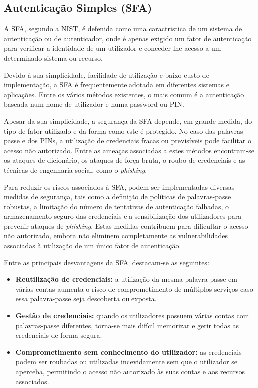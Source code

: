 \subsection{Autenticação Simples (SFA)}

\hspace{1cm} A SFA, segundo a NIST, é defenida como uma caractristica de um sistema de autenticação ou de autenticador, onde é apenas exigido um fator de autenticação  para verificar a identidade de um utilizador e conceder-lhe acesso a um determinado sistema ou recurso.

\hspace{1cm} Devido à sua simplicidade, facilidade de utilização e baixo custo de implementação, a SFA é frequentemente adotada em diferentes sistemas e aplicações. Entre os vários métodos existentes, o mais comum é a autenticação baseada num nome de utilizador e numa password ou PIN.

\hspace{1cm} Apesar da sua simplicidade, a segurança da SFA depende, em grande medida, do tipo de fator utilizado e da forma como este é protegido. No caso das palavras-passe e dos PINs, a utilização de credenciais fracas ou previsíveis pode facilitar o acesso não autorizado. Entre as ameaças associadas a estes métodos encontram-se os ataques de dicionário, os ataques de força bruta, o roubo de credenciais e as técnicas de engenharia social, como o \textit{phishing}. 

\hspace{1cm} Para reduzir os riscos associados à SFA, podem ser implementadas diversas medidas de segurança, tais como a definição de políticas de palavras-passe robustas, a limitação do número de tentativas de autenticação falhadas, o armazenamento seguro das credenciais e a sensibilização dos utilizadores para prevenir ataques de \textit{phishing}. Estas medidas contribuem para dificultar o acesso não autorizado, embora não eliminem completamente as vulnerabilidades associadas à utilização de um único fator de autenticação.

\hspace{1cm} Entre as principais desvantagens da SFA, destacam-se as seguintes:

\begin{itemize}[leftmargin=2cm]
    \item \textbf{Reutilização de credenciais:} a utilização da mesma palavra-passe em várias contas aumenta o risco de comprometimento de múltiplos serviços caso essa palavra-passe seja descoberta ou exposta.

    \item \textbf{Gestão de credenciais:} quando os utilizadores possuem várias contas com palavras-passe diferentes, torna-se mais difícil memorizar e gerir todas as credenciais de forma segura.

    \item \textbf{Comprometimento sem conhecimento do utilizador:} as credenciais podem ser roubadas ou utilizadas indevidamente sem que o utilizador se aperceba, permitindo o acesso não autorizado às suas contas e aos recursos associados.
\end{itemize}

